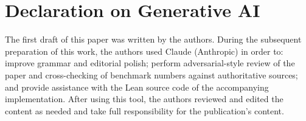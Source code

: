 \documentclass{ceurart}
\begin{document}
\section*{Declaration on Generative AI}
The first draft of this paper was written by the authors.
During the subsequent preparation of this work, the authors
used Claude (Anthropic) in order to: improve grammar and
editorial polish; perform adversarial-style review of the paper
and cross-checking of benchmark numbers against authoritative
sources; and provide assistance with the Lean source code of
the accompanying implementation.  After using this tool, the
authors reviewed and edited the content as needed and take full
responsibility for the publication's content.

\end{document}
